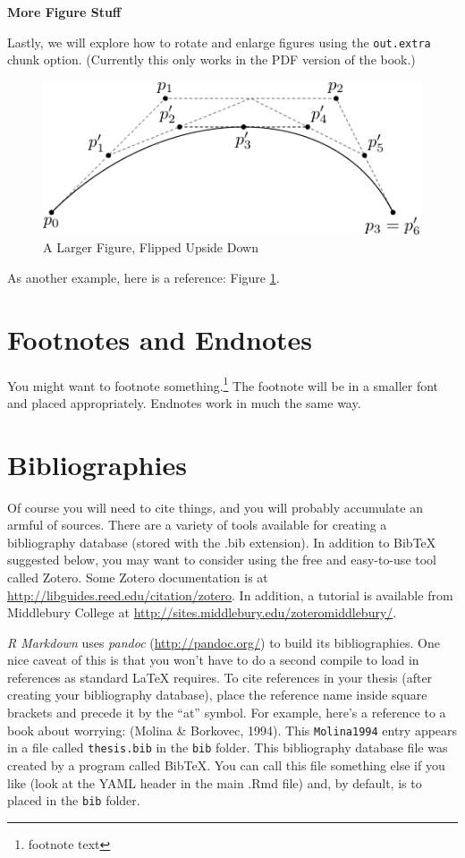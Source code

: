 \documentclass [11pt, proquest] {uwthesis}[2015/03/03]
\begin{document}
\textbf{More Figure Stuff}

Lastly, we will explore how to rotate and enlarge figures using the
\texttt{out.extra} chunk option. (Currently this only works in the PDF
version of the book.)
\begin{figure}
\includegraphics[angle=180, scale=1.1]{figure/subdivision} \caption{A Larger Figure, Flipped Upside Down}\label{fig:subd2}
\end{figure}
As another example, here is a reference: Figure \ref{fig:subd2}.

\section{Footnotes and Endnotes}\label{footnotes-and-endnotes}

You might want to footnote something.\footnote{footnote text} The
footnote will be in a smaller font and placed appropriately. Endnotes
work in much the same way.

\section{Bibliographies}\label{bibliographies}

Of course you will need to cite things, and you will probably accumulate
an armful of sources. There are a variety of tools available for
creating a bibliography database (stored with the .bib extension). In
addition to BibTeX suggested below, you may want to consider using the
free and easy-to-use tool called Zotero. Some Zotero documentation is at
\url{http://libguides.reed.edu/citation/zotero}. In addition, a tutorial
is available from Middlebury College at
\url{http://sites.middlebury.edu/zoteromiddlebury/}.

\emph{R Markdown} uses \emph{pandoc} (\url{http://pandoc.org/}) to build
its bibliographies. One nice caveat of this is that you won't have to do
a second compile to load in references as standard LaTeX requires. To
cite references in your thesis (after creating your bibliography
database), place the reference name inside square brackets and precede
it by the ``at'' symbol. For example, here's a reference to a book about
worrying: (Molina \& Borkovec, 1994). This \texttt{Molina1994} entry
appears in a file called \texttt{thesis.bib} in the \texttt{bib} folder.
This bibliography database file was created by a program called BibTeX.
You can call this file something else if you like (look at the YAML
header in the main .Rmd file) and, by default, is to placed in the
\texttt{bib} folder.
\end{document}
